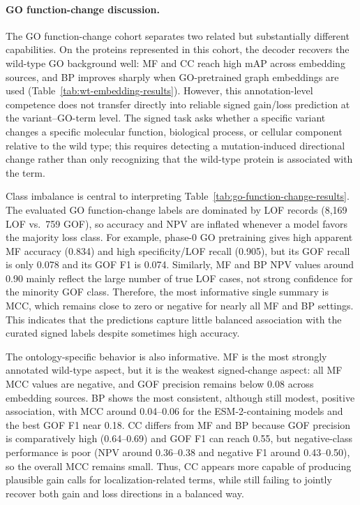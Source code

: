 \documentclass[11pt,a4paper]{article}
\begin{document}
\paragraph{GO function-change discussion.}
The GO function-change cohort separates two related but substantially different capabilities. On the proteins represented in this cohort, the decoder recovers the wild-type GO background well: MF and CC reach high mAP across embedding sources, and BP improves sharply when GO-pretrained graph embeddings are used (Table~\ref{tab:wt-embedding-results}). However, this annotation-level competence does not transfer directly into reliable signed gain/loss prediction at the variant--GO-term level. The signed task asks whether a specific variant changes a specific molecular function, biological process, or cellular component relative to the wild type; this requires detecting a mutation-induced directional change rather than only recognizing that the wild-type protein is associated with the term.

Class imbalance is central to interpreting Table~\ref{tab:go-function-change-results}. The evaluated GO function-change labels are dominated by LOF records (8,169 LOF vs.\ 759 GOF), so accuracy and NPV are inflated whenever a model favors the majority loss class. For example, phase-0 GO pretraining gives high apparent MF accuracy (0.834) and high specificity/LOF recall (0.905), but its GOF recall is only 0.078 and its GOF F1 is 0.074. Similarly, MF and BP NPV values around 0.90 mainly reflect the large number of true LOF cases, not strong confidence for the minority GOF class. Therefore, the most informative single summary is MCC, which remains close to zero or negative for nearly all MF and BP settings. This indicates that the predictions capture little balanced association with the curated signed labels despite sometimes high accuracy.

The ontology-specific behavior is also informative. MF is the most strongly annotated wild-type aspect, but it is the weakest signed-change aspect: all MF MCC values are negative, and GOF precision remains below 0.08 across embedding sources. BP shows the most consistent, although still modest, positive association, with MCC around 0.04--0.06 for the ESM-2-containing models and the best GOF F1 near 0.18. CC differs from MF and BP because GOF precision is comparatively high (0.64--0.69) and GOF F1 can reach 0.55, but negative-class performance is poor (NPV around 0.36--0.38 and negative F1 around 0.43--0.50), so the overall MCC remains small. Thus, CC appears more capable of producing plausible gain calls for localization-related terms, while still failing to jointly recover both gain and loss directions in a balanced way.
\end{document}

